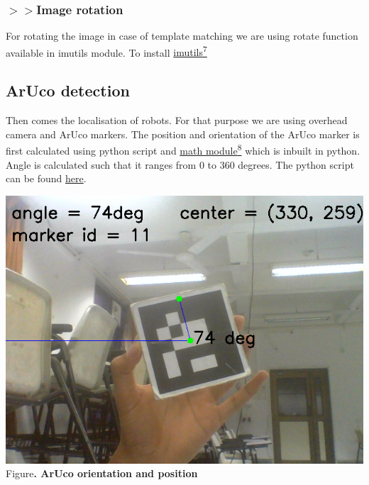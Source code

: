 \documentclass[a4paper,12pt,oneside]{book}
\begin{document}
\subsubsection*{$>>$Image rotation}
For rotating the image in case of template matching we are using rotate function available in imutils module. To install \href{https://www.pyimagesearch.com/2015/02/02/just-open-sourced-personal-imutils-package-series-opencv-convenience-functions/}{imutils\textsuperscript{7}}
\begin{center}
\framebox{\textcolor{gray}{pip install imutils}}
\end{center}
\subsection*{ArUco detection}
Then comes the localisation of robots. For that purpose we are using overhead camera and ArUco markers. The position and orientation of the ArUco marker is first calculated using python script and \href{https://docs.python.org/2/library/math.html}{math module\textsuperscript{8}} which is inbuilt in python. Angle is calculated such that it ranges from 0 to 360 degrees. The python script can be found \href{https://github.com/eYSIP-2018/Jigsaw_Puzzle_Solver_using_Multiple_Robots/blob/master/Scripts/Aruco_pose.py}{here}.
\begin{center}
\includegraphics[scale=0.5]{aruco.png}\\
\small{Figure\textbf{. ArUco orientation and position}}
\end{center}
\end{document}
